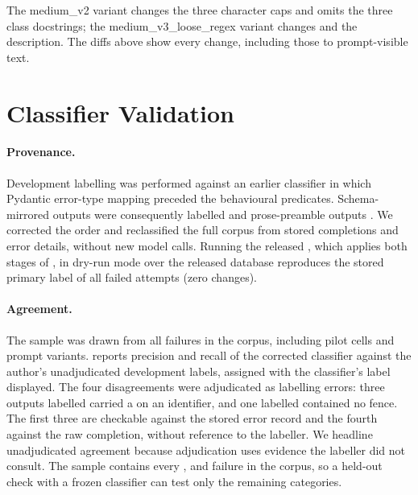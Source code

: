 
The medium\_v2 variant changes the three character caps and omits the
three class docstrings; the medium\_v3\_loose\_regex variant changes
 and the  description.
The diffs above show every change, including those to prompt-visible
text.

\section{Classifier Validation}
\label{app:classifier}

\paragraph{Provenance.}
Development labelling was performed against an earlier classifier in which
Pydantic error-type mapping preceded the behavioural predicates.
Schema-mirrored outputs were consequently labelled 
and prose-preamble outputs . We corrected the order and
reclassified the full corpus from stored completions and error details,
without new model calls. Running the released ,
which applies both stages of , in dry-run mode over the
released database reproduces the stored primary label of all
 failed attempts (zero changes).

\paragraph{Agreement.}
The sample was drawn from all  failures in the corpus,
including pilot cells and prompt variants.  reports
precision and recall of the corrected classifier against the author's
unadjudicated development labels, assigned with the classifier's label
displayed. The four disagreements were adjudicated as labelling
errors: three outputs labelled  carried a
 on an identifier, and one labelled  contained no fence. The first three
are checkable against the stored error record and the fourth against the raw
completion, without reference to the labeller. We headline unadjudicated agreement
because adjudication uses evidence the labeller did not consult. The sample
contains every ,  and
 failure in the corpus, so a held-out check with a
frozen classifier can test only the remaining categories.

